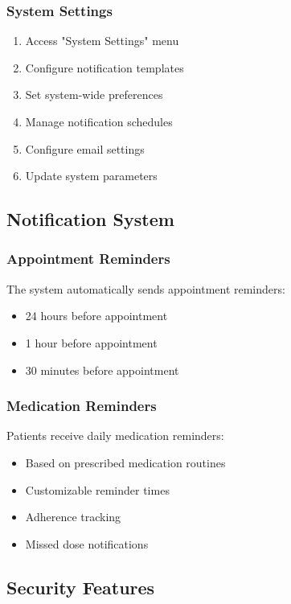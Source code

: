 \documentclass[12pt,a4paper]{article}
\begin{document}
\subsubsection{System Settings}

\begin{enumerate}
    \item Access "System Settings" menu
    \item Configure notification templates
    \item Set system-wide preferences
    \item Manage notification schedules
    \item Configure email settings
    \item Update system parameters
\end{enumerate}

\subsection{Notification System}

\subsubsection{Appointment Reminders}

The system automatically sends appointment reminders:
\begin{itemize}
    \item 24 hours before appointment
    \item 1 hour before appointment
    \item 30 minutes before appointment
\end{itemize}

\subsubsection{Medication Reminders}

Patients receive daily medication reminders:
\begin{itemize}
    \item Based on prescribed medication routines
    \item Customizable reminder times
    \item Adherence tracking
    \item Missed dose notifications
\end{itemize}

\subsection{Security Features}
\end{document}
